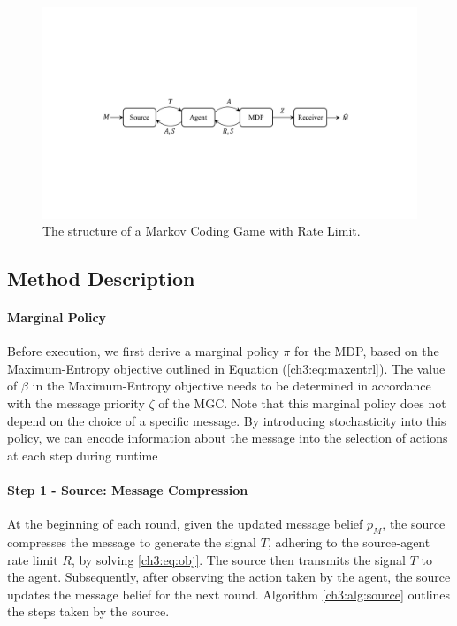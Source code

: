 \begin{figure}[h] 
    \centering \includegraphics[width=0.9\linewidth]{figs/ch3/MGC.pdf}
    \caption{The structure of a Markov Coding Game with Rate Limit.}\label{ch3:fig:mcg} 
\end{figure}

\subsection{Method Description}\label{ch3:sec:mgcmethod}

\paragraph{Marginal Policy} 
Before execution, we first derive a marginal policy $\pi$ for the MDP, based on the Maximum-Entropy objective outlined in Equation (\ref{ch3:eq:maxentrl}). The value of $\beta$ in the Maximum-Entropy objective needs to be determined in accordance with the message priority $\zeta$ of the MGC. Note that this marginal policy does not depend on the choice of a specific message. By introducing stochasticity into this policy, we can encode information about the message into the selection of actions at each step during runtime

\paragraph{Step 1 - Source: Message Compression}
At the beginning of each round, given the updated message belief $p_M$, the source compresses the message to generate the signal $T$, adhering to the source-agent rate limit $R$, by solving \eqref{ch3:eq:obj}. The source then transmits the signal $T$ to the agent. Subsequently, after observing the action taken by the agent, the source updates the message belief for the next round. Algorithm \ref{ch3:alg:source} outlines the steps taken by the source.

